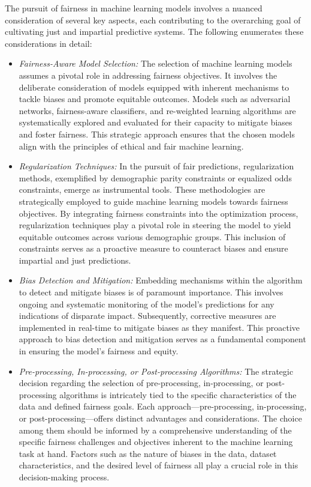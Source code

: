 The pursuit of fairness in machine learning models involves a nuanced consideration of several key aspects, each contributing to the overarching goal of cultivating just and impartial predictive systems. The following enumerates these considerations in detail:

\begin{itemize}
    
    \item \emph{Fairness-Aware Model Selection:} The selection of machine learning models assumes a pivotal role in addressing fairness objectives. It involves the deliberate consideration of models equipped with inherent mechanisms to tackle biases and promote equitable outcomes. Models such as adversarial networks, fairness-aware classifiers, and re-weighted learning algorithms are systematically explored and evaluated for their capacity to mitigate biases and foster fairness. This strategic approach ensures that the chosen models align with the principles of ethical and fair machine learning.

    \item \emph{Regularization Techniques:} In the pursuit of fair predictions, regularization methods, exemplified by demographic parity constraints or equalized odds constraints, emerge as instrumental tools. These methodologies are strategically employed to guide machine learning models towards fairness objectives. By integrating fairness constraints into the optimization process, regularization techniques play a pivotal role in steering the model to yield equitable outcomes across various demographic groups. This inclusion of constraints serves as a proactive measure to counteract biases and ensure impartial and just predictions.

    \item \emph{Bias Detection and Mitigation:} Embedding mechanisms within the algorithm to detect and mitigate biases is of paramount importance. This involves ongoing and systematic monitoring of the model's predictions for any indications of disparate impact. Subsequently, corrective measures are implemented in real-time to mitigate biases as they manifest. This proactive approach to bias detection and mitigation serves as a fundamental component in ensuring the model's fairness and equity.

    \item \emph{Pre-processing, In-processing, or Post-processing Algorithms:} The strategic decision regarding the selection of pre-processing, in-processing, or post-processing algorithms is intricately tied to the specific characteristics of the data and defined fairness goals. Each approach—pre-processing, in-processing, or post-processing—offers distinct advantages and considerations. The choice among them should be informed by a comprehensive understanding of the specific fairness challenges and objectives inherent to the machine learning task at hand. Factors such as the nature of biases in the data, dataset characteristics, and the desired level of fairness all play a crucial role in this decision-making process.

\end{itemize}

